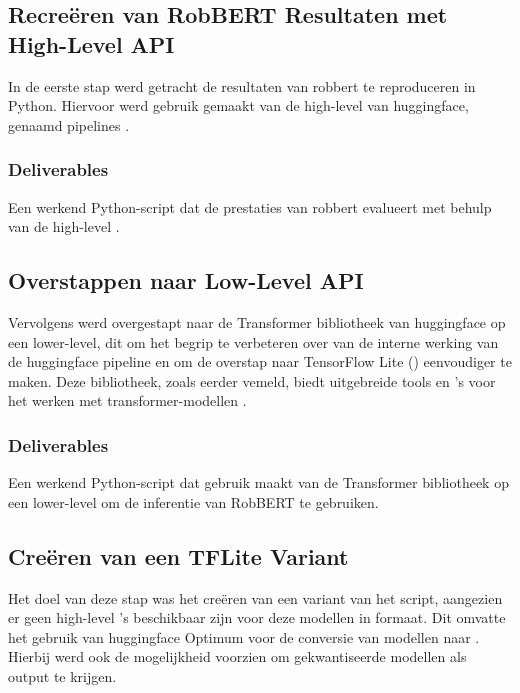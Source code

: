 \subsection{Recreëren van RobBERT Resultaten met High-Level API}

In de eerste stap werd getracht de resultaten van \gls{robbert} te reproduceren in Python. Hiervoor werd gebruik gemaakt van de high-level  van \gls{huggingface}, genaamd pipelines \autocite{HuggingFace2024Pipe}.

\subsubsection{Deliverables}
Een werkend Python-script dat de prestaties van \gls{robbert} evalueert met behulp van de high-level .

\subsection{Overstappen naar Low-Level API}

Vervolgens werd overgestapt naar de Transformer bibliotheek van \gls{huggingface} op een lower-level, dit om het begrip te verbeteren over van de interne werking van de \gls{huggingface} pipeline en om de overstap naar TensorFlow Lite () eenvoudiger te maken. Deze bibliotheek, zoals eerder vemeld, biedt uitgebreide tools en 's voor het werken met \gls{transformer}-modellen \autocite{HuggingFace2024Transformers}.

\subsubsection{Deliverables}
Een werkend Python-script dat gebruik maakt van de Transformer bibliotheek op een lower-level om de inferentie van RobBERT te gebruiken.

\subsection{Creëren van een TFLite Variant}

Het doel van deze stap was het creëren van een  variant van het script, aangezien er geen high-level 's beschikbaar zijn voor deze modellen in  formaat. Dit omvatte het gebruik van \gls{huggingface} Optimum voor de conversie van modellen naar . Hierbij werd ook de mogelijkheid voorzien om gekwantiseerde modellen als output te krijgen.

